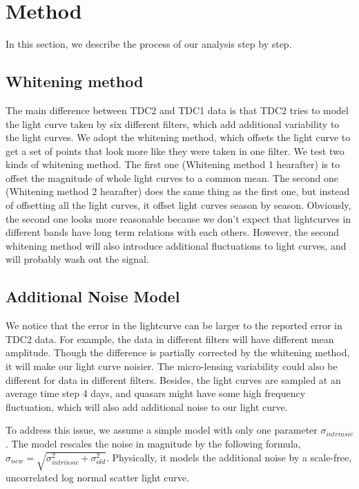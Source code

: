 \documentclass[\docopts]{\docclass}
\begin{document}
\section{Method}
\label{sec:method}

In this section, we describe the process of our analysis step by step.

\subsection{Whitening method}

The main difference between TDC2 and TDC1 data is that TDC2 tries to model the light curve taken by six different filters, which add additional variability to the light curves. We adopt the whitening method, which offsets the light curve to get a set of points that look more like they were taken in one filter. We test two kinds of whitening method. The first one (Whitening method 1 hearafter) is to offset  the magnitude of whole light curves to a common mean. The second one (Whitening method 2 hearafter) does the same thing as the first one, but instead of offsetting all the light curves, it offset light curves season by season. Obviously, the second one looks more reasonable because we don't expect that lightcurves in different bands have long term relations with each others. However, the second whitening method will also introduce additional fluctuations to light curves, and will probably wash out the signal.


\subsection{Additional Noise Model}
We notice that the error in the lightcurve can be larger to the reported error in TDC2 data. For example, the data in different filters will have different mean amplitude. Though the difference is partially corrected by the whitening method, it will make our light curve noisier. The micro-lensing variability could also be different for data in different filters. Besides, the light curves are sampled at an average time step 4 days, and quasars might have some high frequency fluctuation, which will also add additional noise to our light curve.

To address this issue, we assume a simple model with only one parameter $\sigma_{intrinsic}$. The model rescales the noise in magnitude by the following formula, $\sigma_{new}=\sqrt{\sigma_{intrinsic}^2+\sigma_{old}^2}$.  Physically, it models the additional noise by a scale-free, uncorrelated log normal scatter light curve.
\end{document}
